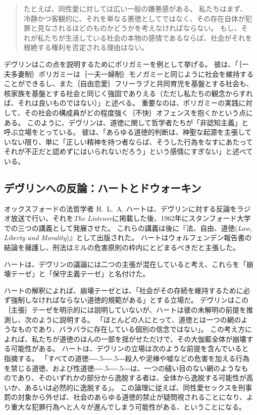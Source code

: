 \documentclass[paper=a4,book,openany]{jlreq}
\newcommand{\ig}[1]{}           %
\def\DDASH{―\kern-.5\zw―\kern-.5\zw―} %
\begin{document}
\begin{quote}
たとえば、同性愛に対しては広い一般の嫌悪感がある。
私たちはまず、冷静かつ客観的に、それを単なる悪徳としてではなく、その存在自体が犯罪と見なされるほどのものかどうかを考えなければならない。
もし、それが私たちが生活している社会の本物の感情であるならば、社会がそれを根絶する権利を否定される理由はない\citep[p.40]{devlin65:_enfor_moral}。
\end{quote}

デヴリン\ig{Patrick Devlin}はこの点を説明するためにポリガミーを例として挙げる。
彼は、「｛一夫多妻制｝{ポリガミー}は｛一夫一婦制｝{モノガミー}と同じように社会を維持することができるし、また｛自由恋愛｝{フリーラブ}と共同育児を基盤とする社会も、核家族を基盤とする社会と同じく強固でありえる（ただし私たちの観念からすれば、それは良いものではない）」と述べる\citep[p.114]{devlin65:_enfor_moral}。
重要なのは、ポリガミーの実践に対して、その社会の構成員がどの程度強く｛不快｝{オフェンス}を抱くかという点にある。
このように、デヴリン\ig{Patrick Devlin}は、道徳に関して哲学者たちが「非認知主義」と呼ぶ立場をとっている。
彼は、「あらゆる道徳的判断は、神聖な起源を主張していない限り、単に「正しい精神を持つ者ならば、そうした行為をなすにあたってそれが不正だと認めずにはいられないだろう」という感情にすぎない」と述べている\citep[p.17]{devlin65:_enfor_moral}。

\subsection{デヴリンへの反論：ハートとドウォーキン}

オックスフォードの法哲学者 H.~L.~A. ハートは、デヴリン\ig{Patrick Devlin}に対する反論をラジオ放送で行い、それを\emph{The Listener}に掲載した後、1962年にスタンフォード大学での三つの講義として発展させた。
これらの講義は後に『法、自由、道徳(\emph{Law, Liberty and Morality})』として出版された。
ハートはウォルフェンデン報告書の結論を擁護し、刑法はミルの危害原則の枠内にとどまるべきだと主張した。

ハートは、デヴリン\ig{Patrick Devlin}の議論には二つの主張が混在していると考え、これらを「崩壊テーゼ」と「保守主義テーゼ」と名付けた\citep[p.115]{hart63:_law_liber_and_moral}。

ハートの解釈によれば、崩壊テーゼとは、「社会がその存続を維持するために必ず強制しなければならない道徳的規範がある」とする立場だ。
デヴリン\ig{Patrick Devlin}はこの｛主張｝{テーゼ}を明示的には説明していないが、ハートは彼の未解明の前提を推測し、次のように説明する。
「ほとんどの人にとって、道徳とは一つの網のようなものであり、バラバラに存在している個別の信念ではない」\citep[pp.50--51]{hart63:_law_liber_and_moral}。
この考え方によれば、私たちが道徳のほんの一部を揺がせただけで、その大伽藍全体が崩壊する可能性がある。
ハートは、デヴリン\ig{Patrick Devlin}の立場は次のような前提を含んでいると指摘する。
「すべての道徳{\DDASH}殺人や泥棒や嘘などの危害を加える行為を禁じる道徳、および性道徳{\DDASH}は、一つの縫い目のない網のようなものであり、そのいずれかの部分から逸脱する者は、全体から逸脱する可能性が高いか、あるいは必然的に逸脱する」\citep[p.50]{hart63:_law_liber_and_moral}。
この論理に従えば、同性愛セックスを刑事罰の対象から外せば、社会のあらゆる道徳的禁止が疑問視されることになり、より重大な犯罪行為へと人々が進んでしまう可能性がある、ということになる。
\end{document}
